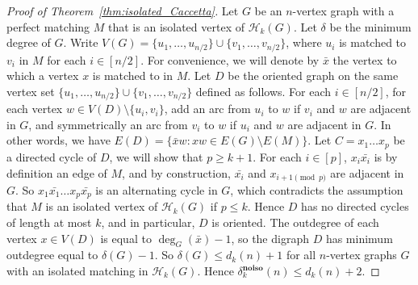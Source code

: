\documentclass[11pt,a4paper]{article}
\theoremstyle{definition}
\begin{document}
\begin{proof}[Proof of Theorem~\ref{thm:isolated_Caccetta}]
  
  Let $G$ be an $n$-vertex graph with a
  perfect matching $M$ that is an isolated vertex of $\mathcal{H}_k(G)$. Let
  $\delta$ be the minimum degree of $G$. Write
  $V(G) = \{u_1, \dots, u_{n/2}\} \cup \{v_1, \dots, v_{n/2}\}$, where $u_i$ is
  matched to $v_i$ in $M$ for each $i \in [n/2]$. For convenience, we will
  denote by $\bar x$ the vertex to which a vertex $x$ is matched to in $M$.  Let
  $D$ be the oriented graph on the same vertex set
  $\{u_1, \dots, u_{n/2}\} \cup \{v_1, \dots, v_{n/2}\}$ defined as follows. For
  each $i \in [n/2]$, for each vertex $w \in V(D) \setminus \{u_i,v_i\}$, add an
  arc from $u_i$ to $w$ if $v_i$ and $w$ are adjacent in $G$, and symmetrically
  an arc from $v_i$ to $w$ if $u_i$ and $w$ are adjacent in $G$. In other words,
  we have $E(D) = \{\bar xw \colon xw \in E(G) \setminus E(M)\}$. Let $C = x_1\dots x_p$
  be a directed cycle of $D$, we will show that $p \ge k+1$. For each
  $i \in [p]$, $x_i\bar{x_i}$ is by definition an edge of $M$, and by
  construction, $\bar{x_i}$ and $x_{i+1 \pmod p}$ are adjacent in $G$. So
  $x_1\bar{x_1}\dots x_p\bar{x_p}$ is an alternating cycle in $G$, which
  contradicts the assumption that $M$ is an isolated vertex of
  $\mathcal{H}_k(G)$ if $p\le k$. Hence $D$ has no directed cycles of length at
  most $k$, and in particular, $D$ is oriented. The outdegree
  of each vertex $x \in V(D)$ is equal to $\deg_G(\bar x)-1$, so the digraph $D$
  has minimum outdegree equal to $\delta(G) -1$. So $\delta(G) \le d_k(n) +1$
  for all $n$-vertex graphs $G$ with an isolated matching in
  $\mathcal{H}_k(G)$. Hence $\delta^{\mathbf{no iso}}_k(n) \le d_k(n)+2$.
\end{proof}
\end{document}
